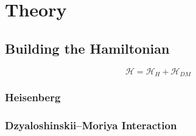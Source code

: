 \section{Theory}



\subsection{Building the Hamiltonian}

\begin{equation}
	\mathcal{H} = \mathcal{H}_H +\mathcal{H}_{DM}
\end{equation}


\subsubsection{Heisenberg}



\subsubsection{Dzyaloshinskii–Moriya Interaction}